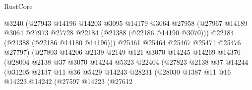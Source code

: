\begin{lexlean}{RustCore}
\begin{coremodule}
                                  @3240
                                  (@27943
                                    @14196
                                    @14203
                                    @3095
                                    @14179
                                    @3064
                                    @27958
                                    (@27967
                                      @14189
                                      @3064
                                      @27973
                                      @27728
                                      @22184
                                      (@21388 (@22186 @14190 @3070)))
                                    @22184
                                    (@21388 (@22186 @14180 @14196)))
                                  @25461
                                  @25464
                                  @25467
                                  @25471
                                  @25476
                                  @27797)
                                (@27803
                                  @14206
                                  @2139
                                  @2149
                                  @121
                                  @3070
                                  @14245
                                  @14269
                                  @14370
                                  (@28004
                                    @2138
                                    @37
                                    @3070
                                    @14244
                                    @5323
                                    @22404
                                    (@27823
                                      @2138
                                      @37
                                      @14244
                                      (@31205
                                        @2137
                                        @11
                                        @36
                                        @5429
                                        @14243
                                        @28231
                                        (@28030
                                          @1387
                                          @11
                                          @16
                                          @14223
                                          @14242
                                          (@27597
                                            @14223
                                            (@27612

\end{coremodule}
\end{lexlean}
